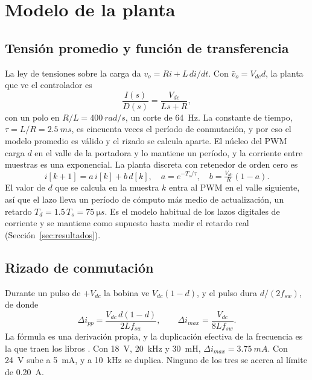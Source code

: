 \documentclass[journal]{IEEEtran}
\begin{document}
\section{Modelo de la planta}
\label{sec:modelo}

\subsection{Tensión promedio y función de transferencia}
\label{sec:ft}
La ley de tensiones sobre la carga da $v_o=Ri+L\,di/dt$. Con $\bar v_o=V_{dc}d$, la planta que ve el controlador es
\begin{equation}
	\frac{I(s)}{D(s)}=\frac{V_{dc}}{Ls+R},
	\label{eq:planta}
\end{equation}
con un polo en $R/L=\SI{400}{rad/s}$, un corte de \SI{64}{Hz}. La constante de tiempo, $\tau=L/R=\SI{2.5}{ms}$, es cincuenta veces el período de conmutación, y por eso el modelo promedio es válido y el rizado se calcula aparte. El núcleo del PWM carga $d$ en el valle de la portadora y lo mantiene un período, y la corriente entre muestras es una exponencial. La planta discreta con retenedor de orden cero es
\begin{equation}
	i[k+1]=a\,i[k]+b\,d[k],\quad a=e^{-T_s/\tau},\quad b=\tfrac{V_{dc}}{R}(1-a).
	\label{eq:discreta}
\end{equation}
El valor de $d$ que se calcula en la muestra $k$ entra al PWM en el valle siguiente, así que el lazo lleva un período de cómputo más medio de actualización, un retardo $T_d=1.5\,T_s=\SI{75}{\micro s}$. Es el modelo habitual de los lazos digitales de corriente y se mantiene como supuesto hasta medir el retardo real (Sección~\ref{sec:resultados}).

\subsection{Rizado de conmutación}
\label{sec:rizado}
Durante un pulso de $+V_{dc}$ la bobina ve $V_{dc}(1-d)$, y el pulso dura $d/(2f_{sw})$, de donde
\begin{equation}
	\Delta i_{pp}=\frac{V_{dc}\,d(1-d)}{2Lf_{sw}},\qquad
	\Delta i_{max}=\frac{V_{dc}}{8Lf_{sw}}.
	\label{eq:rizado}
\end{equation}
La fórmula es una derivación propia, y la duplicación efectiva de la frecuencia es la que traen los libros \cite{mohan2003power,hart2011}. Con \SI{18}{V}, \SI{20}{kHz} y \SI{30}{mH}, $\Delta i_{max}=\SI{3.75}{mA}$. Con \SI{24}{V} sube a \SI{5}{mA}, y a \SI{10}{kHz} se duplica. Ninguno de los tres se acerca al límite de \SI{0.20}{A}.
\end{document}
